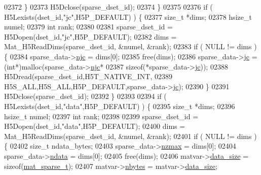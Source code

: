 \begin{DoxyCode}
{{{{{{{{{{02372                 \}
02373                 H5Dclose(sparse\_dset\_id);
02374             \}
02375 
02376             \textcolor{keywordflow}{if} ( H5Lexists(dset\_id,\textcolor{stringliteral}{"jc"},H5P\_DEFAULT) ) \{
02377                 \textcolor{keywordtype}{size\_t} *dims;
02378                 hsize\_t numel;
02379                 \textcolor{keywordtype}{int} rank;
02380 
02381                 sparse\_dset\_id = H5Dopen(dset\_id,\textcolor{stringliteral}{"jc"},H5P\_DEFAULT);
02382                 dims = Mat\_H5ReadDims(sparse\_dset\_id, &numel, &rank);
02383                 \textcolor{keywordflow}{if} ( NULL != dims ) \{
02384                     sparse\_data->\hyperlink{group___m_a_t_a482d8e4b40aa975f0c1daf146ebe08a4}{njc} = dims[0];
02385                     free(dims);
02386                     sparse\_data->\hyperlink{group___m_a_t_ad1e74cdc4f7eff1e47a670297c01da4b}{jc} = (\textcolor{keywordtype}{int}*)malloc(sparse\_data->\hyperlink{group___m_a_t_a482d8e4b40aa975f0c1daf146ebe08a4}{njc}*
02387                                             \textcolor{keyword}{sizeof}(*sparse\_data->\hyperlink{group___m_a_t_ad1e74cdc4f7eff1e47a670297c01da4b}{jc}));
02388                     H5Dread(sparse\_dset\_id,H5T\_NATIVE\_INT,
02389                             H5S\_ALL,H5S\_ALL,H5P\_DEFAULT,sparse\_data->\hyperlink{group___m_a_t_ad1e74cdc4f7eff1e47a670297c01da4b}{jc});
02390                 \}
02391                 H5Dclose(sparse\_dset\_id);
02392             \}
02393 
02394             \textcolor{keywordflow}{if} ( H5Lexists(dset\_id,\textcolor{stringliteral}{"data"},H5P\_DEFAULT) ) \{
02395                 \textcolor{keywordtype}{size\_t} *dims;
02396                 hsize\_t numel;
02397                 \textcolor{keywordtype}{int} rank;
02398 
02399                 sparse\_dset\_id = H5Dopen(dset\_id,\textcolor{stringliteral}{"data"},H5P\_DEFAULT);
02400                 dims = Mat\_H5ReadDims(sparse\_dset\_id, &numel, &rank);
02401                 \textcolor{keywordflow}{if} ( NULL != dims ) \{
02402                     \textcolor{keywordtype}{size\_t} ndata\_bytes;
02403                     sparse\_data->\hyperlink{group___m_a_t_ad79471861cb948e32671be6d4089173a}{nzmax} = dims[0];
02404                     sparse\_data->\hyperlink{group___m_a_t_a1beb8a8c58a808207cbea650563a9b63}{ndata} = dims[0];
02405                     free(dims);
02406                     matvar->\hyperlink{group___m_a_t_a9ad1c82e2b568da617e12dc73a26e1f9}{data\_size} = \textcolor{keyword}{sizeof}(\hyperlink{group___m_a_t_gad1332d0eb4faa5a99377919f84b77baf}{mat\_sparse\_t});
02407                     matvar->\hyperlink{group___m_a_t_abf1c844540503be2df9bb3db93cfe307}{nbytes}    = matvar->\hyperlink{group___m_a_t_a9ad1c82e2b568da617e12dc73a26e1f9}{data\_size};
}}}}}}}}}}
\end{DoxyCode}
